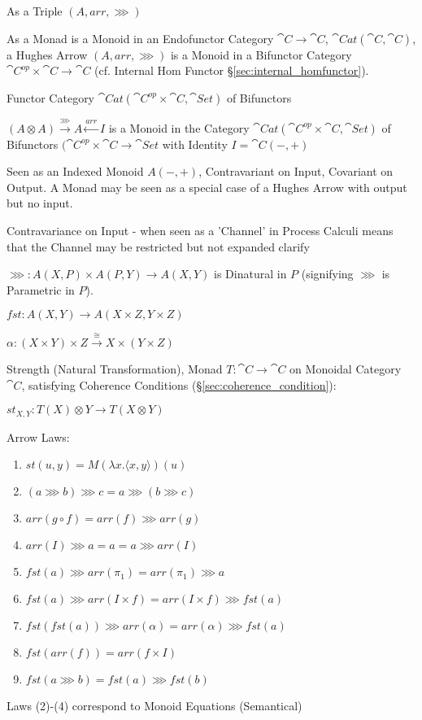 As a Triple $(A, arr, \ggg)$

As a Monad is a Monoid in an Endofunctor Category $\cat{C} \rightarrow
\cat{C}$, $\cat{Cat}(\cat{C},\cat{C})$, a Hughes Arrow $(A, arr,
\ggg)$ is a Monoid in a Bifunctor Category $\cat{C}^{op} \times
\cat{C} \rightarrow \cat{C}$ (cf. Internal Hom Functor
\S\ref{sec:internal_homfunctor}).

Functor Category $\cat{Cat}(\cat{C}^{op} \times \cat{C},
\cat{Set})$ of Bifunctors

$(A \otimes A) \xrightarrow{\ggg} A \xleftarrow{arr} I$ is a Monoid in
the Category $\cat{Cat} (\cat{C}^{op} \times \cat{C}, \cat{Set})$ of
Bifunctors $(\cat{C}^{op} \times \cat{C} \rightarrow \cat{Set}$ with
Identity $I = \cat{C} (-,+)$

Seen as an Indexed Monoid $A(-,+)$, Contravariant on Input, Covariant
on Output. A Monad may be seen as a special case of a Hughes Arrow
with output but no input.

Contravariance on Input - when seen as a 'Channel' in Process Calculi
means that the Channel may be restricted but not expanded %
clarify

$\ggg : A(X,P) \times A(P,Y) \rightarrow A(X,Y)$ is Dinatural in $P$
(signifying $\ggg$ is Parametric in $P$). \cite{jacobs-heunen-hasuo09}

$fst : A(X,Y) \rightarrow A(X \times Z, Y \times Z)$

$\alpha : (X \times Y) \times Z
\xrightarrow{\cong} X \times (Y \times Z)$

Strength (Natural Transformation), Monad $T : \cat{C} \rightarrow
\cat{C}$ on Monoidal Category $\cat{C}$, satisfying Coherence
Conditions (\S\ref{sec:coherence_condition}):

$st_{X,Y} : T(X) \otimes Y \rightarrow T(X \otimes Y)$

Arrow Laws:
\begin{enumerate}
  \item $st(u,y) = M(\lambda x.\langle x,y \rangle)(u)$
  \item $(a \ggg b) \ggg c = a \ggg (b \ggg c)$
  \item $arr (g \circ f) = arr(f) \ggg arr(g)$
  \item $arr(I) \ggg a = a = a \ggg arr(I)$
  \item $fst(a) \ggg arr(\pi_1) = arr(\pi_1) \ggg a$
  \item $fst(a) \ggg arr (I \times f) = arr (I \times f) \ggg fst(a)$
  \item $fst (fst(a)) \ggg arr(\alpha) = arr(\alpha) \ggg fst(a)$
  \item $fst (arr(f)) = arr (f \times I)$
  \item $fst (a \ggg b) = fst(a) \ggg fst(b)$
\end{enumerate}
Laws (2)-(4) correspond to Monoid Equations (Semantical)

